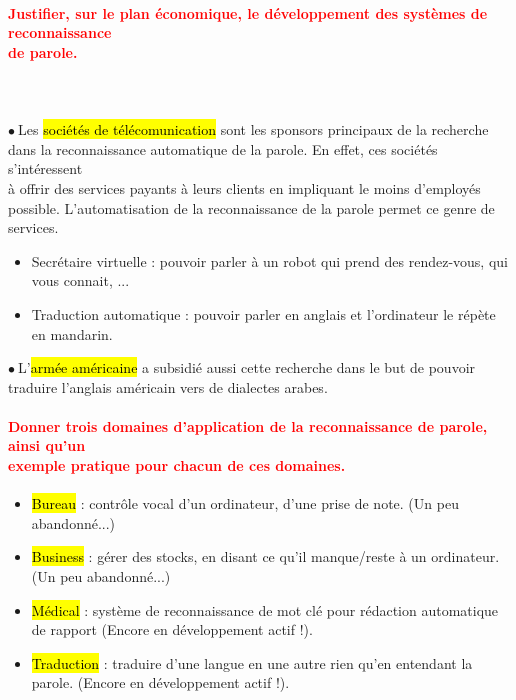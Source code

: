 \documentclass[letterpaper, 12pt]{article}
\newcommand{\alinea}{
\hspace*{0.3cm}}
\newcommand{\red}[1]{
	\textcolor{red}{#1}
}
\newcommand{\point}{$\bullet\ $}
\begin{document}
		\paragraph{\red{Justifier, sur le plan économique, le développement des systèmes de reconnaissance 
		~\\ \hspace*{0.035cm} de parole.}}~\\~\\
			\point Les \hl{soci\'et\'es de t\'el\'ecomunication} sont les sponsors principaux de la recherche
				\\\alinea dans la reconnaissance automatique de la parole. En effet, ces sociétés s'intéressent
				\\\alinea à offrir des services payants à leurs clients en impliquant le moins d'employés
				\\\alinea possible. L'automatisation de la reconnaissance de la parole permet ce genre de services.
			\begin{itemize}
				\setlength{\itemsep}{0pt}		
				\setlength{\parskip}{0pt}		
				\setlength{\parsep}{0pt}	
				\item Secrétaire virtuelle : pouvoir parler à un robot qui prend des rendez-vous, qui vous connait,
					...
				\item Traduction automatique : pouvoir parler en anglais et l'ordinateur le répète en mandarin.
			\end{itemize}
			\point L'\hl{arm\'ee am\'ericaine} a subsidié aussi cette recherche dans le but de pouvoir traduire 
				l'anglais américain vers de dialectes arabes.
		
		\paragraph{\red{Donner trois domaines d'application de la reconnaissance de parole, ainsi qu'un 
		~\\ \hspace*{0.035cm} exemple pratique pour chacun de ces domaines.}}
			\begin{itemize}
				\setlength{\itemsep}{0pt}		
				\setlength{\parskip}{0pt}		
				\setlength{\parsep}{0pt}	
				\item \hl{Bureau} : contrôle vocal d'un ordinateur, d'une prise de note. (Un peu abandonné...)
				\item \hl{Business} : gérer des stocks, en disant ce qu'il manque/reste à un ordinateur. 
					(Un peu	abandonné...)
				\item \hl{M\'edical} : système de reconnaissance de mot clé pour rédaction automatique
					de rapport (Encore en développement actif !).
				\item \hl{Traduction} : traduire d'une langue en une autre rien qu'en entendant la parole. 
					(Encore en développement
					actif !).
			\end{itemize}
		
\end{document}
